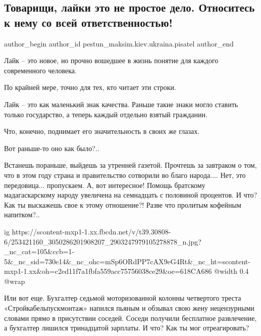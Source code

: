  
 
 
 
 
 
\subsection{Товарищи, лайки это не простое дело. Относитесь к нему со всей ответственностью!}
\label{sec:06_11_2021.fb.pestun_maksim.kiev.ukraina.pisatel.1.lajk}
 
\ifcmt
 author_begin
   author_id pestun_maksim.kiev.ukraina.pisatel
 author_end
\fi

Лайк – это новое, но прочно вошедшее в жизнь понятие для каждого современного
человека.

По крайней мере, точно для тех, кто читает эти строки.

Лайк – это как маленький знак качества. Раньше такие знаки могло ставить только
государство, а теперь каждый отдельно взятый гражданин.

Что, конечно, поднимает его значительность в своих же глазах.

Вот раньше-то оно как было?..

Встанешь пораньше, выйдешь за утренней газетой. Прочтешь за завтраком о том,
что в этом году страна и правительство сотворили во благо народа.... Нет, это
передовица... пропускаем. А, вот интересное! Помощь братскому мадагаскарскому
народу увеличена на семнадцать с половиной процентов. И что? Как ты выскажешь
свое к этому отношение?! Разве что пролитым кофейным напитком?..

\ifcmt
  ig https://scontent-mxp1-1.xx.fbcdn.net/v/t39.30808-6/253421160_3050286201908207_2903247979105278878_n.jpg?_nc_cat=105&ccb=1-5&_nc_sid=730e14&_nc_ohc=mSp6ORdPP7cAX9eG4Rt&_nc_ht=scontent-mxp1-1.xx&oh=c2ed11f7a1fbfa559acc75756038ce29&oe=618CA686
  @width 0.4
  @wrap 
\fi

Или вот еще. Бухгалтер седьмой моторизованной колонны четвертого треста
«Стройкабельпускмонтаж» напился пьяным и обзывал свою жену нецензурными словами
прямо в присутствии соседей. Соседи получили бесплатное развлечение, а
бухгалтер лишился тринадцатой зарплаты. И что? Как ты мог отреагировать?

